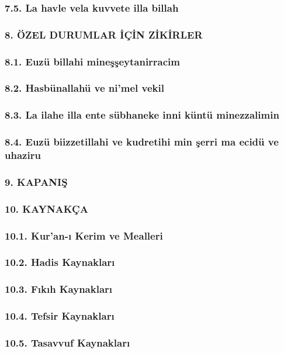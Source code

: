 \documentclass[12pt,a4paper]{article}
\begin{document}
\subsubsection{7.5. La havle vela kuvvete illa billah}
\subsubsection{8. ÖZEL DURUMLAR İÇİN ZİKİRLER}
\subsubsection{8.1. Euzü billahi mineşşeytanirracim}
\subsubsection{8.2. Hasbünallahü ve ni'mel vekil}
\subsubsection{8.3. La ilahe illa ente sübhaneke inni küntü minezzalimin}
\subsubsection{8.4. Euzü biizzetillahi ve kudretihi min şerri ma ecidü ve uhaziru}
\subsubsection{9. KAPANIŞ}
\subsubsection{10. KAYNAKÇA}
\subsubsection{10.1. Kur'an-ı Kerim ve Mealleri}
\subsubsection{10.2. Hadis Kaynakları}
\subsubsection{10.3. Fıkıh Kaynakları}
\subsubsection{10.4. Tefsir Kaynakları}
\subsubsection{10.5. Tasavvuf Kaynakları}
\end{document}
